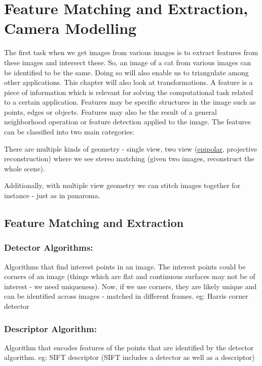 \chapter{Feature Matching and Extraction, Camera Modelling}

The first task when we get images from various images is to extract features from these images and intersect these. So, an image of a cat from various images can be identified to be the same. Doing so will also enable us to triangulate among other applications. This chapter will also look at transformations. A feature is a piece of information which is relevant for solving the computational task related to a certain application. Features may be specific structures in the image such as points, edges or objects. Features may also be the result of a general neighborhood operation or feature detection applied to the image. The features can be classified into two main categories:

There are multiple kinds of geometry - single view, two view (\href{https://web.stanford.edu/class/cs231a/course_notes/03-epipolar-geometry.pdf}{epipolar}, projective reconstruction) where we see stereo matching (given two images, reconstruct the whole scene).

Additionally, with multiple view geometry we can stitch images together for instance - just as in panaroma.

\section{Feature Matching and Extraction}

\subsection{Detector Algorithms:} Algorithms that find interest points in an image. The interest points could be corners of an image (things which are flat and continuous surfaces may not be of interest - we need uniqueness). Now, if we use corners, they are likely unique and can be identified across images - matched in different frames. eg: Harris corner detector

\subsection{Descriptor Algorithm:} Algorithm that encodes features of the points that are identified by the detector algorithm. eg: SIFT descriptor (SIFT includes a detector as well as a descriptor)

